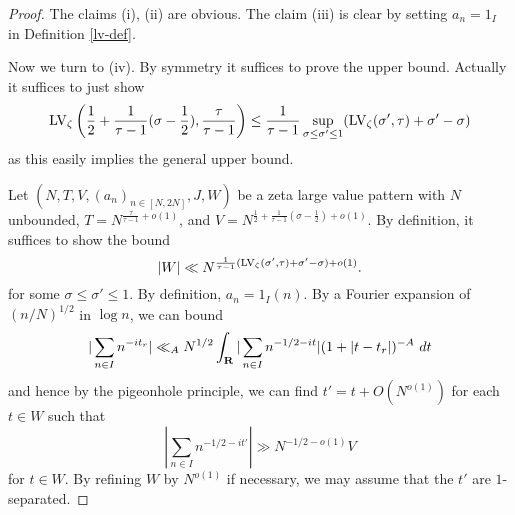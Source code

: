\begin{proof}  The claims (i), (ii) are obvious.  The claim (iii) is clear by setting $a_n = 1_I$ in Definition \ref{lv-def}.

    Now we turn to (iv).  By symmetry it suffices to prove the upper bound.  Actually it suffices to just show
    $$ \mathrm{LV}_\zeta\left(\frac{1}{2} + \frac{1}{\tau-1} (\sigma-\frac{1}{2}), \frac{\tau}{\tau-1}\right) \leq \frac{1}{\tau-1} \sup_{\sigma \leq \sigma' \leq 1} (\mathrm{LV}_\zeta(\sigma',\tau) + \sigma'-\sigma)$$
    as this easily implies the general upper bound.

    Let $(N,T,V,(a_n)_{n \in [N,2N]},J,W)$ be a zeta large value pattern with
    $N$ unbounded, $T= N^{\frac{\tau}{\tau-1}+o(1)}$, and $V = N^{\frac{1}{2} + \frac{1}{\tau-1} (\sigma-\frac{1}{2})+o(1)}$. By definition, it suffices to show the bound
    \begin{equation}\label{r-targ}
        |W| \ll N^{\frac{1}{\tau-1} (\mathrm{LV}_\zeta(\sigma',\tau) + \sigma'-\sigma)+o(1)}.
    \end{equation}
    for some $\sigma \leq \sigma' \leq 1$.
    By definition, $a_n = 1_I(n)$. By a Fourier expansion of $(n/N)^{1/2}$ in $\log n$, we can bound
    $$ |\sum_{n \in I} n^{-it_r}| \ll_A N^{1/2} \int_\R |\sum_{n \in I} n^{-1/2-it}| (1 + |t-t_r|)^{-A}\ dt$$
    and hence by the pigeonhole principle, we can find $t' = t + O(N^{o(1)})$ for each $t \in W$ such that
    $$ |\sum_{n \in I} n^{-1/2-it'}| \gg N^{-1/2-o(1)} V$$
    for $t \in W$.  By refining $W$ by $N^{o(1)}$ if necessary, we may assume that the $t'$ are $1$-separated.


\end{proof}
